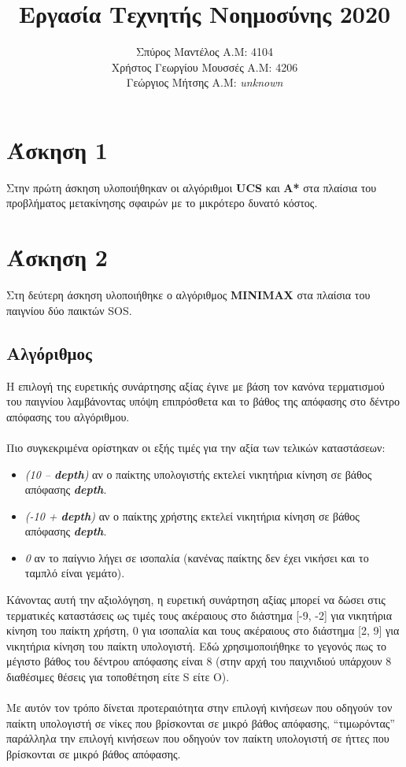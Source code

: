 \documentclass{article}
\title{Εργασία Τεχνητής Νοημοσύνης 2020}
\author{Σπύρος Μαντέλος Α.Μ: 4104\\Χρήστος Γεωργίου Μουσσές Α.Μ: 4206\\Γεώργιος Μήτσης Α.Μ: \textit{unknown}}
\date{}
\begin{document}
\maketitle
\section*{Άσκηση 1}
Στην πρώτη άσκηση υλοποιήθηκαν οι αλγόριθμοι \textbf{UCS} και \textbf{A*} στα πλαίσια του προβλήματος μετακίνησης σφαιρών με το μικρότερο δυνατό κόστος.
\newpage
\section*{Άσκηση 2}
Στη δεύτερη άσκηση υλοποιήθηκε ο αλγόριθμος \textbf{MINIMAX} στα πλαίσια του παιγνίου δύο παικτών SOS.
\subsection*{Αλγόριθμος}
Η επιλογή της ευρετικής συνάρτησης αξίας έγινε με βάση τον κανόνα τερματισμού του παιγνίου λαμβάνοντας υπόψη επιπρόσθετα και το βάθος της απόφασης στο δέντρο απόφασης του αλγόριθμου.\\\\
Πιο συγκεκριμένα ορίστηκαν οι εξής τιμές για την αξία των τελικών καταστάσεων:
\begin{itemize}
    \item \textit{(10 – \textbf{depth})} αν ο παίκτης υπολογιστής εκτελεί νικητήρια κίνηση σε βάθος απόφασης \textit{\textbf{depth}}.
    \item \textit{(-10 + \textbf{depth})} αν ο παίκτης χρήστης εκτελεί νικητήρια κίνηση σε βάθος απόφασης \textit{\textbf{depth}}.
    \item \textit{0} αν το παίγνιο λήγει σε ισοπαλία (κανένας παίκτης δεν έχει νικήσει και το ταμπλό είναι γεμάτο).
\end{itemize}
Κάνοντας αυτή την αξιολόγηση, η ευρετική συνάρτηση αξίας μπορεί να δώσει στις τερματικές καταστάσεις ως τιμές τους ακέραιους στο διάστημα
[-9, -2] για νικητήρια κίνηση του παίκτη χρήστη, 0 για ισοπαλία και τους ακέραιους στο διάστημα [2, 9] για
νικητήρια κίνηση του παίκτη υπολογιστή. Εδώ χρησιμοποιήθηκε το γεγονός πως το μέγιστο βάθος του δέντρου
απόφασης είναι 8 (στην αρχή του παιχνιδιού υπάρχουν 8 διαθέσιμες θέσεις
για τοποθέτηση είτε S είτε O).\\\\
Με αυτόν τον τρόπο δίνεται προτεραιότητα στην επιλογή κινήσεων που οδηγούν τον παίκτη υπολογιστή σε νίκες που βρίσκονται σε μικρό βάθος απόφασης, “τιμωρόντας” παράλληλα την επιλογή
κινήσεων που οδηγούν τον παίκτη υπολογιστή σε ήττες που βρίσκονται σε μικρό βάθος απόφασης.
\end{document}
